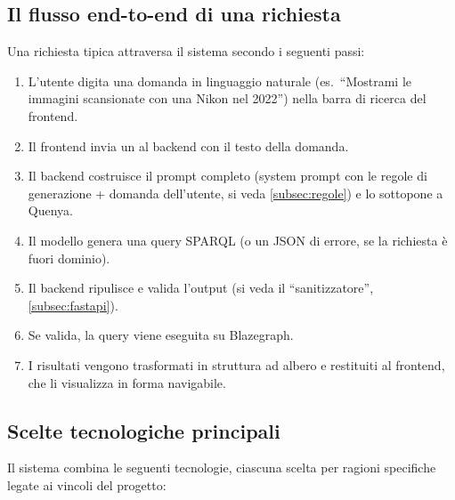   \subsection{Il flusso end-to-end di una richiesta}\label{subsec:flusso_e2e}

    Una richiesta tipica attraversa il sistema secondo i seguenti passi:

    \begin{enumerate}
      \item L'utente digita una domanda in linguaggio naturale (es.\ ``Mostrami le immagini scansionate con una Nikon nel 2022'') nella barra di ricerca del frontend.
      \item Il frontend invia un  al backend con il testo della domanda.
      \item Il backend costruisce il prompt completo (system prompt con le regole di generazione + domanda dell'utente, si veda \cref{subsec:regole}) e lo sottopone a Quenya.\@
      \item Il modello genera una query SPARQL (o un JSON di errore, se la richiesta è fuori dominio).
      \item Il backend ripulisce e valida l'output (si veda il ``sanitizzatore'', \cref{subsec:fastapi}).
      \item Se valida, la query viene eseguita su Blazegraph.
      \item I risultati vengono trasformati in struttura ad albero e restituiti al frontend, che li visualizza in forma navigabile.
    \end{enumerate}

  \subsection{Scelte tecnologiche principali}\label{subsec:scelte_tech}
    Il sistema combina le seguenti tecnologie, ciascuna scelta per ragioni specifiche legate ai vincoli del progetto:

